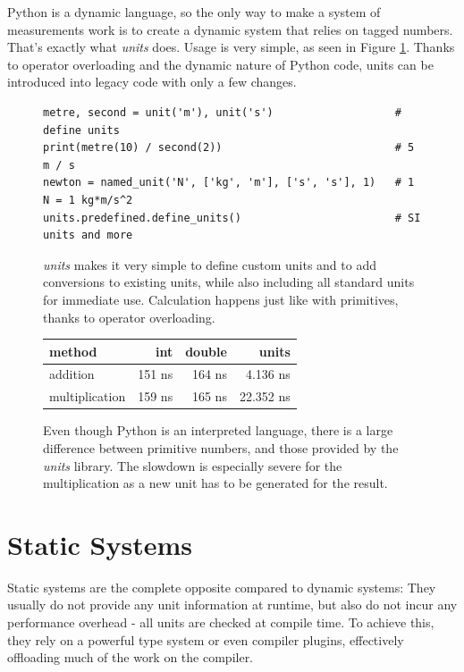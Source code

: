 \documentclass[12pt,oneside,a4paper]{scrbook}
\theoremstyle{definition}
\begin{document}
Python is a dynamic language, so the only way to make a system of measurements work is to create a dynamic system that relies on tagged numbers. That's exactly what \emph{units} \citep{Donohue12} does. Usage is very simple, as seen in Figure \ref{code:python_units}. Thanks to operator overloading and the dynamic nature of Python code, units can be introduced into legacy code with only a few changes.

\begin{figure}
\begin{verbatim}
metre, second = unit('m'), unit('s')                   # define units
print(metre(10) / second(2))                           # 5 m / s
newton = named_unit('N', ['kg', 'm'], ['s', 's'], 1)   # 1 N = 1 kg*m/s^2
units.predefined.define_units()                        # SI units and more
\end{verbatim}
\caption{\emph{units} makes it very simple to define custom units and to add conversions to existing units, while also including all standard units for immediate use. Calculation happens just like with primitives, thanks to operator overloading.}
\label{code:python_units}
\end{figure}



\begin{figure}
\begin{tabular}{lrrr}
method          & int    & double  & units \\
\midrule
addition        & 151 ns &  164 ns    &    4.136 ns \\
multiplication  & 159 ns &  165 ns    &   22.352 ns
\end{tabular}
\caption{Even though Python is an interpreted language, there is a large difference between primitive numbers, and those provided by the \emph{units} library. The slowdown is especially severe for the multiplication as a new unit has to be generated for the result.}
\label{bench:python_units}
\end{figure}


\section{Static Systems}

Static systems are the complete opposite compared to dynamic systems: They usually do not provide any unit information at runtime, but also do not incur any performance overhead - all units are checked at compile time. To achieve this, they rely on a powerful type system or even compiler plugins, effectively offloading much of the work on the compiler.
\end{document}
